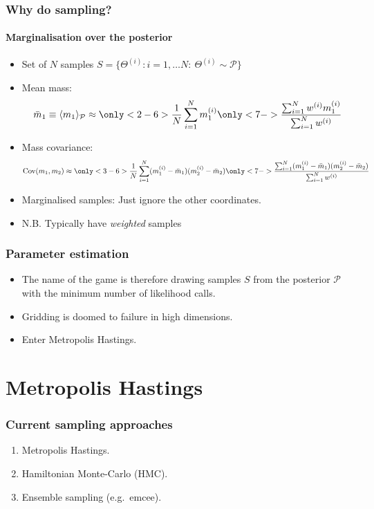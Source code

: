\documentclass[%
]{beamer}
\begin{document}
\begin{frame}
    \frametitle{Why do sampling?}
    \framesubtitle{Marginalisation over the posterior}

    \begin{itemize}
        \item<1-> Set of $N$ samples $S = \{\Theta^{(i)}: i=1,\ldots N:\: \Theta^{(i)}\sim\mathcal{P}\}$
        \item<2-> Mean mass: \[
                \bar{m}_1 \equiv\langle m_1\rangle_\mathcal{P} \approx 
                \only<2-6>{\frac{1}{N}\sum_{i=1}^N m_1^{(i)}}
                \only<7->{\frac{\sum_{i=1}^N w^{(i)} m_1^{(i)}}{\sum_{i=1}^N w^{(i)}}}
            \]
        \item<3-> Mass covariance: \[
                \mathrm{Cov}(m_1,m_2) \approx 
                \only<3-6>{\frac{1}{N}\sum_{i=1}^N (m_1^{(i)}-\bar{m}_1)(m_2^{(i)}-\bar{m}_2)}
                \only<7->{\frac{\sum_{i=1}^N (m_1^{(i)}-\bar{m}_1)(m_2^{(i)}-\bar{m}_2)}{\sum_{i=1}^N w^{(i)}}}
            \]
        \item<4-> Marginalised samples: Just ignore the other coordinates.
        \item<5-> N.B. Typically have {\em weighted\/} samples
    \end{itemize}
\end{frame}

\begin{frame}
    \frametitle{Parameter estimation}
    \begin{itemize}
        \pause\item The name of the game is therefore drawing samples $S$ from the posterior $\mathcal{P}$ with the minimum number of likelihood calls.
        \pause\item Gridding is doomed to failure in high dimensions.
        \pause\item Enter Metropolis Hastings.
    \end{itemize}
\end{frame}



\section{Metropolis Hastings}

\begin{frame}
    \frametitle{Current sampling approaches}
    \begin{enumerate}
        \pause\item Metropolis Hastings.
        \pause\item Hamiltonian Monte-Carlo (HMC).
        \pause\item Ensemble sampling (e.g.\ emcee).
    \end{enumerate}
\end{frame}
\end{document}
